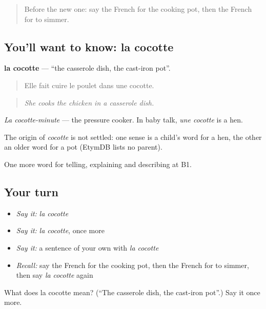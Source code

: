 \label{lesson:FR-C330-cocotte}



\begin{quote}
Before the new one: say the French for the cooking pot, then the French for to simmer.
\end{quote}

\subsection*{You'll want to know: la cocotte}
\textbf{la cocotte} — \textquotedblleft{}the casserole dish, the cast-iron pot\textquotedblright{}.

\begin{quote}
Elle fait cuire le poulet dans une cocotte.
\end{quote}

\begin{quote}
\emph{She cooks the chicken in a casserole dish.}
\end{quote}

\emph{La cocotte-minute} — the pressure cooker. In baby talk, \emph{une cocotte} is a hen.

\begin{cousinweb}
The origin of \emph{cocotte} is not settled: one sense is a child's word for a hen, the other an older word for a pot (EtymDB lists no parent).
\end{cousinweb}

\begin{grammarlens}[title={What you've built}]
One more word for telling, explaining and describing at B1.
\end{grammarlens}

\subsection*{Your turn}
\begin{itemize}
\raggedright
  \item \emph{Say it:} \emph{la cocotte}
  \item \emph{Say it:} \emph{la cocotte}, once more
  \item \emph{Say it:} a sentence of your own with \emph{la cocotte}
  \item \emph{Recall:} say the French for the cooking pot, then the French for to simmer, then say \emph{la cocotte} again
\end{itemize}

\begin{tcolorbox}[breakable,colback=teal!4,colframe=teal!35!black,title={Before you move on}]
What does la cocotte mean? (\textquotedblleft{}The casserole dish, the cast-iron pot\textquotedblright{}.) Say it once more.
\end{tcolorbox}
